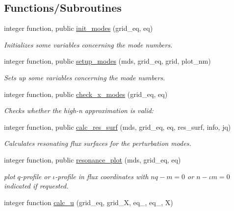 \subsection*{Functions/\+Subroutines}
\begin{DoxyCompactItemize}
\item 
integer function, public \hyperlink{namespacex__ops_a73a80c582379669f8e07b09dd7456878}{init\+\_\+modes} (grid\+\_\+eq, eq)
\begin{DoxyCompactList}\small\item\em Initializes some variables concerning the mode numbers. \end{DoxyCompactList}\item 
integer function, public \hyperlink{namespacex__ops_a504451aabcab7d6f0fa59feae08ef8dd}{setup\+\_\+modes} (mds, grid\+\_\+eq, grid, plot\+\_\+nm)
\begin{DoxyCompactList}\small\item\em Sets up some variables concerning the mode numbers. \end{DoxyCompactList}\item 
integer function, public \hyperlink{namespacex__ops_a7d9275e2d927d92548416f21b983b604}{check\+\_\+x\+\_\+modes} (grid\+\_\+eq, eq)
\begin{DoxyCompactList}\small\item\em Checks whether the high-\/n approximation is valid\+: \end{DoxyCompactList}\item 
integer function, public \hyperlink{namespacex__ops_a1a90026bbbeddc25e82cfdd304df251f}{calc\+\_\+res\+\_\+surf} (mds, grid\+\_\+eq, eq, res\+\_\+surf, info, jq)
\begin{DoxyCompactList}\small\item\em Calculates resonating flux surfaces for the perturbation modes. \end{DoxyCompactList}\item 
integer function, public \hyperlink{namespacex__ops_abdaf1308e13cede3a153e8c6cf35a637}{resonance\+\_\+plot} (mds, grid\+\_\+eq, eq)
\begin{DoxyCompactList}\small\item\em plot $q$-\/profile or $\iota$-\/profile in flux coordinates with $nq-m = 0$ or $n-\iota m = 0$ indicated if requested. \end{DoxyCompactList}\item 
integer function \hyperlink{namespacex__ops_a4e39701da15ff952add5133db1897b52}{calc\+\_\+u} (grid\+\_\+eq, grid\+\_\+X, eq\+\_, eq\+\_, X)

\end{DoxyCompactItemize}
